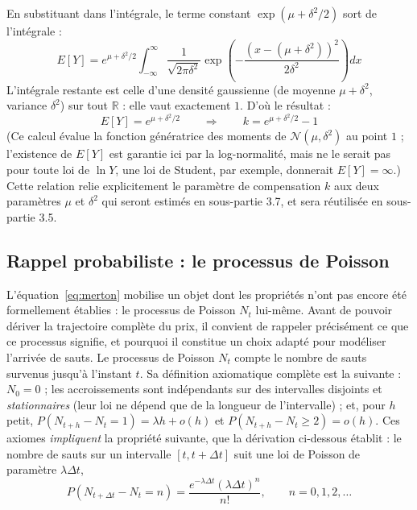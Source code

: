 \documentclass{article}
\begin{document}
En substituant dans l'intégrale, le terme constant $\exp(\mu+\delta^2/2)$ sort de l'intégrale :
\begin{equation}
E[Y] = e^{\mu+\delta^2/2} \int_{-\infty}^{\infty} \frac{1}{\sqrt{2\pi\delta^2}} \exp\left(-\frac{\left(x-(\mu+\delta^2)\right)^2}{2\delta^2}\right) dx
\end{equation}
L'intégrale restante est celle d'une densité gaussienne (de moyenne $\mu+\delta^2$, variance $\delta^2$) sur tout $\mathbb{R}$ : elle vaut exactement $1$. D'où le résultat :
\begin{equation}
E[Y] = e^{\mu+\delta^2/2} \qquad \Longrightarrow \qquad k = e^{\mu+\delta^2/2} - 1
\label{eq:k}
\end{equation}
(Ce calcul évalue la fonction génératrice des moments de $\mathcal{N}(\mu,\delta^2)$ au point $1$ ; l'existence de $E[Y]$ est garantie ici par la log-normalité, mais ne le serait pas pour toute loi de $\ln Y$, une loi de Student, par exemple, donnerait $E[Y]=\infty$.) Cette relation relie explicitement le paramètre de compensation $k$ aux deux paramètres $\mu$ et $\delta^2$ qui seront estimés en sous-partie 3.7, et sera réutilisée en sous-partie 3.5.
\subsection{Rappel probabiliste : le processus de Poisson}
L'équation~\eqref{eq:merton} mobilise un objet dont les propriétés n'ont pas encore été formellement établies : le processus de Poisson $N_t$ lui-même. Avant de pouvoir dériver la trajectoire complète du prix, il convient de rappeler précisément ce que ce processus signifie, et pourquoi il constitue un choix adapté pour modéliser l'arrivée de sauts.
Le processus de Poisson $N_t$ compte le nombre de sauts survenus jusqu'à l'instant $t$. Sa définition axiomatique complète est la suivante : $N_0=0$ ; les accroissements sont indépendants sur des intervalles disjoints et \emph{stationnaires} (leur loi ne dépend que de la longueur de l'intervalle) ; et, pour $h$ petit, $P(N_{t+h}-N_t=1)=\lambda h+o(h)$ et $P(N_{t+h}-N_t\geq 2)=o(h)$. Ces axiomes \emph{impliquent} la propriété suivante, que la dérivation ci-dessous établit : le nombre de sauts sur un intervalle $[t,t+\Delta t]$ suit une loi de Poisson de paramètre $\lambda \Delta t$,
\begin{equation}
P(N_{t+\Delta t}-N_t = n) = \frac{e^{-\lambda\Delta t}(\lambda\Delta t)^n}{n!}, \qquad n=0,1,2,\dots
\end{equation}
\end{document}
